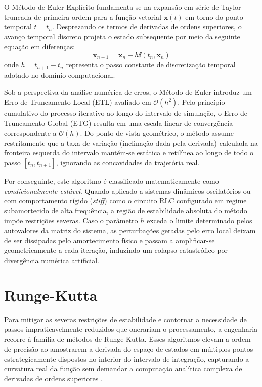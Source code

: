 \documentclass[11pt, a4paper]{article}
\begin{document}
O Método de Euler Explícito fundamenta-se na expansão em série de Taylor truncada de primeira ordem para a função vetorial $\mathbf{x}(t)$ em torno do ponto temporal $t=t_n$. Desprezando os termos de derivadas de ordens superiores, o avanço temporal discreto projeta o estado subsequente por meio da seguinte equação em diferenças:
\begin{equation}
    \mathbf{x}_{n+1} = \mathbf{x}_n + h \mathbf{f}(t_n, \mathbf{x}_n)
\end{equation}
onde $h = t_{n+1} - t_n$ representa o passo constante de discretização temporal adotado no domínio computacional.

Sob a perspectiva da análise numérica de erros, o Método de Euler introduz um Erro de Truncamento Local (ETL) avaliado em $\mathcal{O}(h^2)$. Pelo princípio cumulativo do processo iterativo ao longo do intervalo de simulação, o Erro de Truncamento Global (ETG) resulta em uma escala linear de convergência correspondente a $\mathcal{O}(h)$. Do ponto de vista geométrico, o método assume restritamente que a taxa de variação (inclinação dada pela derivada) calculada na fronteira esquerda do intervalo mantém-se estática e retilínea ao longo de todo o passo $[t_n, t_{n+1}]$, ignorando as concavidades da trajetória real.

Por conseguinte, este algoritmo é classificado matematicamente como \textit{condicionalmente estável}. Quando aplicado a sistemas dinâmicos oscilatórios ou com comportamento rígido (\textit{stiff}) como o circuito RLC configurado em regime subamortecido de alta frequência, a região de estabilidade absoluta do método impõe restrições severas. Caso o parâmetro $h$ exceda o limite determinado pelos autovalores da matriz do sistema, as perturbações geradas pelo erro local deixam de ser dissipadas pelo amortecimento físico e passam a amplificar-se geometricamente a cada iteração, induzindo um colapso catastrófico por divergência numérica artificial.

\section{Runge-Kutta}

Para mitigar as severas restrições de estabilidade e contornar a necessidade de passos impraticavelmente reduzidos que onerariam o processamento, a engenharia recorre à família de métodos de Runge-Kutta. Esses algoritmos elevam a ordem de precisão ao amostrarem a derivada do espaço de estados em múltiplos pontos estrategicamente dispostos no interior do intervalo de integração, capturando a curvatura real da função sem demandar a computação analítica complexa de derivadas de ordens superiores \cite{firgelli2026rk, stackexchange2015}.
\end{document}
